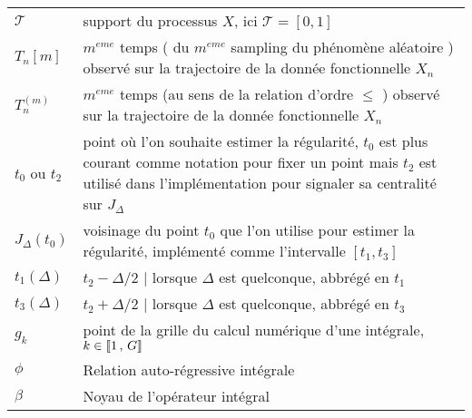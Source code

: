 \begin{table}[H]
\begin{tabularx}{\textwidth}{lX}
		\midrule
		$\mathcal T$      & support du processus $X$, ici $\mathcal T = [0,1]$                                                                                                                                              \\
		$T_n[m]$          & $m^{eme}$ temps ( du $m^{eme}$ sampling du phénomène aléatoire ) observé sur la trajectoire de la donnée fonctionnelle $X_n$                                                                    \\
		$T_n^{(m)}$       & $m^{eme}$ temps (au sens de la relation d'ordre $\leq$ ) observé sur la trajectoire de la donnée fonctionnelle $X_n$                                                                            \\
		$t_0$ ou $t_2$    & point où l'on souhaite estimer la régularité, $t_0$ est plus courant comme notation pour fixer un point mais $t_2$ est utilisé dans l'implémentation pour signaler sa centralité sur $J_\Delta$ \\
		$J_\Delta(t_0)$   & \og voisinage \fg du point $t_0$ que l'on utilise pour estimer la régularité, implémenté comme l'intervalle $[t_1, t_3]$                                                                        \\
		$t_1(\Delta)$     & $t_2 - \Delta/2$ | lorsque $\Delta$ est quelconque, abbrégé en $t_1$                                                                                                                            \\
		$t_3(\Delta)$     & $t_2 + \Delta/2$ | lorsque $\Delta$ est quelconque, abbrégé en $t_3$                                                                                                                            \\
		$g_k$             & point de la grille du calcul numérique d'une intégrale, $k \in \llbracket 1 \, , \, G \rrbracket$                                                                                                               \\
		\midrule
		$\phi$            & Relation auto-régressive intégrale                                                                                                                                                              \\
		$\beta$           & Noyau de l'opérateur intégral                                                                                                                                                                   \\
		\midrule

\end{tabularx}
\end{table}

